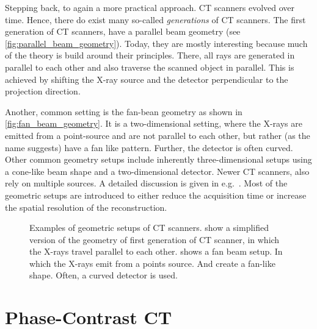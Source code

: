 Stepping back, to again a more practical approach. CT scanners evolved over time. Hence, there do
exist many so-called \textit{generations} of CT scanners. The first generation of CT scanners, have
a parallel beam geometry (see \autoref{fig:parallel_beam_geometry}). Today, they are mostly
interesting because much of the theory is build around their principles. There, all rays are
generated in parallel to each other and also traverse the scanned object in parallel. This is
achieved by shifting the X-ray source and the detector perpendicular to the projection direction.

Another, common setting is the fan-bean geometry as shown in \autoref{fig:fan_beam_geometry}. It is
a two-dimensional setting, where the X-rays are emitted from a point-source and are not parallel to
each other, but rather (as the name suggests) have a fan like pattern. Further, the detector is
often curved. Other common geometry setups include inherently three-dimensional setups using a
cone-like beam shape and a two-dimensional detector. Newer CT scanners, also rely on multiple
sources. A detailed discussion is given in e.g.\ \cite{buzug_computed_2008}. Most of the geometric
setups are introduced to either reduce the acquisition time or increase the spatial resolution of
the reconstruction.

\begin{figure}
	\centering
	\caption{Examples of geometric setups of CT scanners. 
		show a simplified version of the geometry of first generation of CT scanner, in
		which the X-rays travel parallel to each other.  shows
		a fan beam setup. In which the X-rays emit from a points source. And create a
		fan-like shape. Often, a curved detector is used.}\label{fig:ct_geometry_setup}
\end{figure}

\section{Phase-Contrast CT}\label{sec:phasecontrast_ct}

